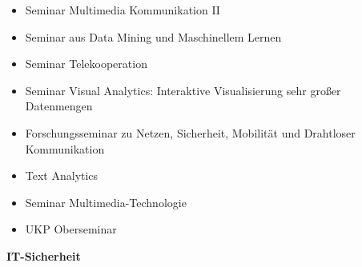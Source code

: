 {\begin{itemize}[noitemsep]
        \item Seminar Multimedia Kommunikation II
        \item Seminar aus Data Mining und Maschinellem Lernen
        \item Seminar Telekooperation
        \item Seminar Visual Analytics: Interaktive Visualisierung sehr großer Datenmengen
        \item Forschungsseminar zu Netzen, Sicherheit, Mobilität und Drahtloser Kommunikation
        \item Text Analytics
        \item Seminar Multimedia-Technologie
        \item UKP Oberseminar
    \end{itemize}

    \noindent\textbf{IT-Sicherheit}

}
